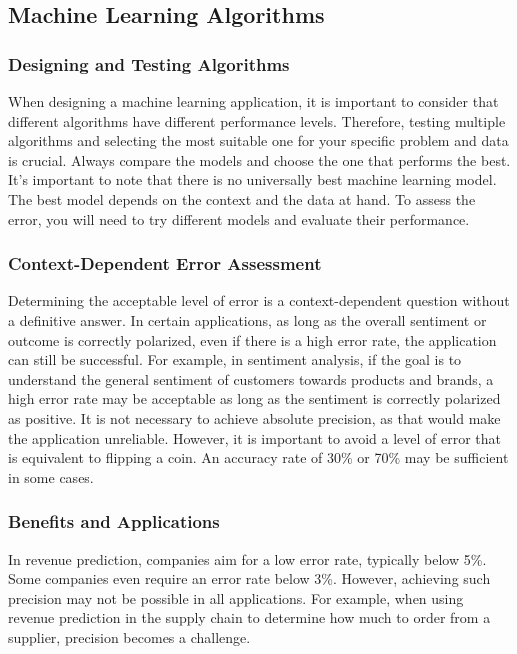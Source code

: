 \subsection{Machine Learning Algorithms}

\subsubsection{Designing and Testing Algorithms}

When designing a machine learning application, it is important to
consider that different algorithms have different performance levels.
Therefore, testing multiple algorithms and selecting the most suitable
one for your specific problem and data is crucial. Always compare the
models and choose the one that performs the best. It's important to note
that there is no universally best machine learning model. The best model
depends on the context and the data at hand. To assess the error, you
will need to try different models and evaluate their performance.

\subsubsection{Context-Dependent Error Assessment}

Determining the acceptable level of error is a context-dependent
question without a definitive answer. In certain applications, as long
as the overall sentiment or outcome is correctly polarized, even if
there is a high error rate, the application can still be successful. For
example, in sentiment analysis, if the goal is to understand the general
sentiment of customers towards products and brands, a high error rate
may be acceptable as long as the sentiment is correctly polarized as
positive. It is not necessary to achieve absolute precision, as that
would make the application unreliable. However, it is important to avoid
a level of error that is equivalent to flipping a coin. An accuracy rate
of 30\% or 70\% may be sufficient in some cases.

\subsubsection{Benefits and Applications}

In revenue prediction, companies aim for a low error rate, typically
below 5\%. Some companies even require an error rate below 3\%. However,
achieving such precision may not be possible in all applications. For
example, when using revenue prediction in the supply chain to determine
how much to order from a supplier, precision becomes a challenge.


